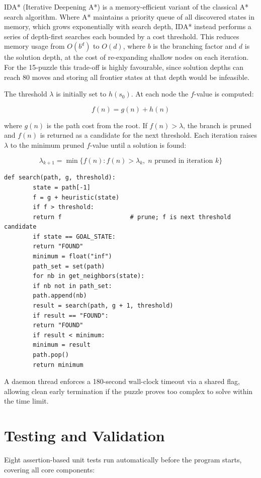\documentclass[11pt]{article}
\begin{document}
	IDA* (Iterative Deepening A*) is a memory-efficient variant of the classical 
	A* search algorithm. Where A* maintains a priority queue of all discovered 
	states in memory, which grows exponentially with search depth, IDA* instead 
	performs a series of depth-first searches each bounded by a cost threshold. 
	This reduces memory usage from $O(b^d)$ to $O(d)$, where $b$ is the branching 
	factor and $d$ is the solution depth, at the cost of re-expanding shallow nodes 
	on each iteration. For the 15-puzzle this trade-off is highly favourable, since 
	solution depths can reach 80 moves and storing all frontier states at that 
	depth would be infeasible.
	
	The threshold $\lambda$ is initially set to $h(s_0)$. At each node the 
	$f$-value is computed:
	
	\[
	f(n) = g(n) + h(n)
	\]
	
	where $g(n)$ is the path cost from the root. If $f(n) > \lambda$, the branch 
	is pruned and $f(n)$ is returned as a candidate for the next threshold. 
	Each iteration raises $\lambda$ to the minimum pruned $f$-value until a 
	solution is found:
	
	\[
	\lambda_{k+1} = \min\{f(n) : f(n) > \lambda_k,\; n \text{ pruned in iteration } k\}
	\]
	
	\begin{lstlisting}[caption={Core IDA* search loop}]
		def search(path, g, threshold):
		state = path[-1]
		f = g + heuristic(state)
		if f > threshold:
		return f                   # prune; f is next threshold candidate
		if state == GOAL_STATE:
		return "FOUND"
		minimum = float("inf")
		path_set = set(path)
		for nb in get_neighbors(state):
		if nb not in path_set:
		path.append(nb)
		result = search(path, g + 1, threshold)
		if result == "FOUND":
		return "FOUND"
		if result < minimum:
		minimum = result
		path.pop()
		return minimum
	\end{lstlisting}
	
	A daemon thread enforces a 180-second wall-clock timeout via a shared flag, 
	allowing clean early termination if the puzzle proves too complex to solve 
	within the time limit.
	
	\section{Testing and Validation}
	
	Eight assertion-based unit tests run automatically before the program starts, 
	covering all core components:
	
\end{document}
